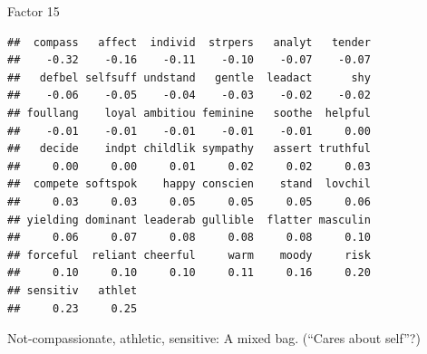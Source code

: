 \begin{frame}[fragile]{Factor 15}
  
  {\footnotesize
\begin{knitrout}
\color{fgcolor}\begin{kframe}
\begin{alltt}
\hlstd{mylist[[}\hlstd{]]}
\end{alltt}
\begin{verbatim}
##  compass   affect  individ  strpers   analyt   tender 
##    -0.32    -0.16    -0.11    -0.10    -0.07    -0.07 
##   defbel selfsuff undstand   gentle  leadact      shy 
##    -0.06    -0.05    -0.04    -0.03    -0.02    -0.02 
## foullang    loyal ambitiou feminine   soothe  helpful 
##    -0.01    -0.01    -0.01    -0.01    -0.01     0.00 
##   decide    indpt childlik sympathy   assert truthful 
##     0.00     0.00     0.01     0.02     0.02     0.03 
##  compete softspok    happy conscien    stand  lovchil 
##     0.03     0.03     0.05     0.05     0.05     0.06 
## yielding dominant leaderab gullible  flatter masculin 
##     0.06     0.07     0.08     0.08     0.08     0.10 
## forceful  reliant cheerful     warm    moody     risk 
##     0.10     0.10     0.10     0.11     0.16     0.20 
## sensitiv   athlet 
##     0.23     0.25
\end{verbatim}
\end{kframe}
\end{knitrout}
}

Not-compassionate, athletic, sensitive: A mixed bag. (``Cares about self''?)

\end{frame}


